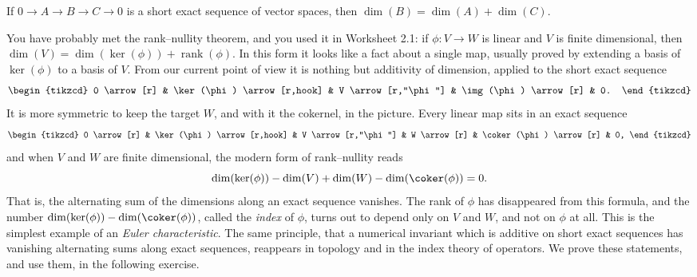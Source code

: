 \documentclass[12pt,reqno]{amsart}
\providecommand{\rank}{\operatorname{rank}}
\begin{document}
\begin{theorem}
If $0\to A\to B\to C\to0$ is a short exact sequence of vector spaces, then $\dim(B)=\dim(A)+\dim(C)$.
\end{theorem}

You have probably met the rank--nullity theorem, and you used it in Worksheet 2.1: if $\phi:V\to W$ is linear and $V$ is finite dimensional, then $\dim(V)=\dim(\ker(\phi))+\rank(\phi)$. In this form it looks like a fact about a single map, usually proved by extending a basis of $\ker(\phi)$ to a basis of $V$. From our current point of view it is nothing but additivity of dimension, applied to the short exact sequence
\[
\begin{tikzcd}
0 \arrow[r] & \ker(\phi) \arrow[r,hook] & V \arrow[r,"\phi"] & \img(\phi) \arrow[r] & 0.
\end{tikzcd}
\]
It is more symmetric to keep the target $W$, and with it the cokernel, in the picture. Every linear map sits in an exact sequence
\[
\begin{tikzcd}
0 \arrow[r] & \ker(\phi) \arrow[r,hook] & V \arrow[r,"\phi"] & W \arrow[r] & \coker(\phi) \arrow[r] & 0,
\end{tikzcd}
\]
and when $V$ and $W$ are finite dimensional, the modern form of rank--nullity reads
\[
\dim(\ker(\phi))-\dim(V)+\dim(W)-\dim(\coker(\phi))=0.
\]
That is, the alternating sum of the dimensions along an exact sequence vanishes. The rank of $\phi$ has disappeared from this formula, and the number $\dim(\ker(\phi))-\dim(\coker(\phi))$, called the \emph{index} of $\phi$, turns out to depend only on $V$ and $W$, and not on $\phi$ at all. This is the simplest example of an \emph{Euler characteristic}. The same principle, that a numerical invariant which is additive on short exact sequences has vanishing alternating sums along exact sequences, reappears in topology and in the index theory of operators. We prove these statements, and use them, in the following exercise.

\hrulefill
\end{document}

